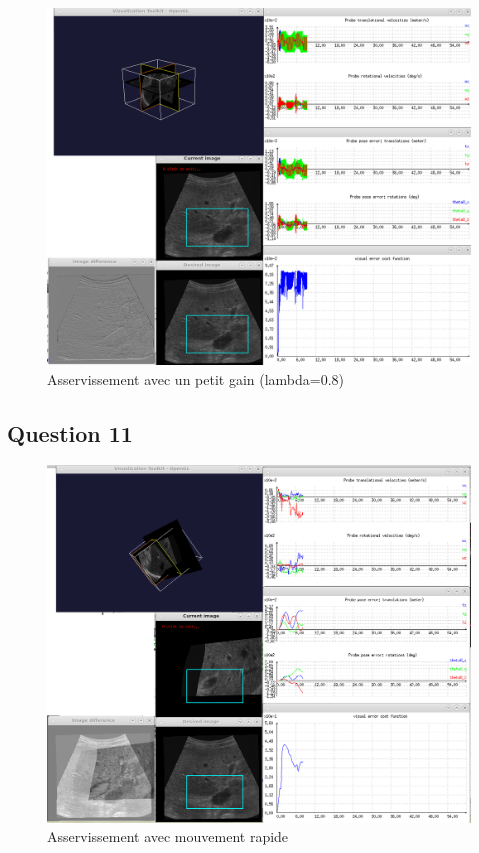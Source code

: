 \documentclass[a4paper,11pt]{article}
\begin{document}
\begin{figure}[H]
    \centering
    \includegraphics[width=0.5\textheight]{./images/q10_big.png}
    \caption{Asservissement avec un petit gain (lambda=0.8)}
    \label{bigGain}
\end{figure}

\subsection{Question 11}
\begin{figure}[H]
    \centering
    \includegraphics[width=1.0\textwidth]{./images/q11_0,4.png}
    \caption{Asservissement avec mouvement rapide }
    \label{fastMove}
\end{figure}
\end{document}
